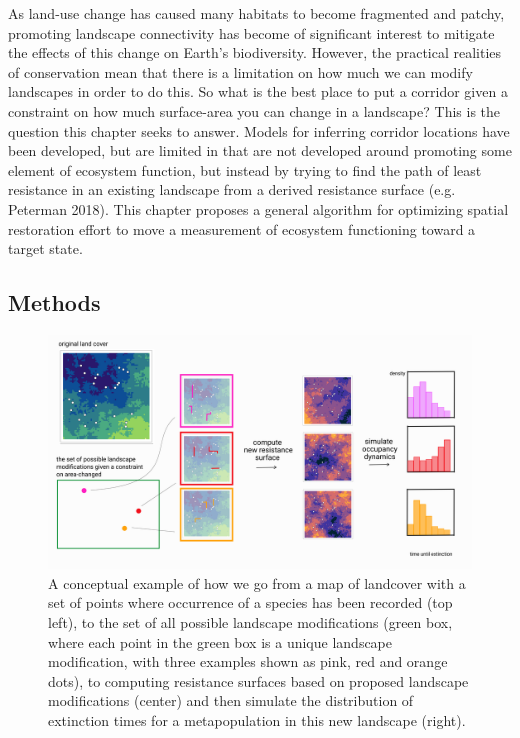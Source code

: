 \documentclass[11pt]{article}
\makeatletter
\def\maxwidth{\ifdim\Gin@nat@width>\linewidth\linewidth
\else\Gin@nat@width\fi}
\let\Oldincludegraphics\includegraphics
\renewcommand{\includegraphics}[1]{\Oldincludegraphics[width=\maxwidth]{#1}}
\makeatother
\begin{document}
As land-use change has caused many habitats to become fragmented and
patchy, promoting landscape connectivity has become of significant
interest to mitigate the effects of this change on Earth's biodiversity.
However, the practical realities of conservation mean that there is a
limitation on how much we can modify landscapes in order to do this. So
what is the best place to put a corridor given a constraint on how much
surface-area you can change in a landscape? This is the question this
chapter seeks to answer. Models for inferring corridor locations have
been developed, but are limited in that are not developed around
promoting some element of ecosystem function, but instead by trying to
find the path of least resistance in an existing landscape from a
derived resistance surface (e.g. Peterman 2018). This chapter proposes a
general algorithm for optimizing spatial restoration effort to move a
measurement of ecosystem functioning toward a target state.

\hypertarget{methods-2}{%
\subsection{Methods}\label{methods-2}}

\begin{figure}
\hypertarget{fig:ch3}{%
\centering
\includegraphics{./figures/ch3.png}
\caption{A conceptual example of how we go from a map of landcover with
a set of points where occurrence of a species has been recorded (top
left), to the set of all possible landscape modifications (green box,
where each point in the green box is a unique landscape modification,
with three examples shown as pink, red and orange dots), to computing
resistance surfaces based on proposed landscape modifications (center)
and then simulate the distribution of extinction times for a
metapopulation in this new landscape (right).}\label{fig:ch3}
}
\end{figure}
\end{document}
